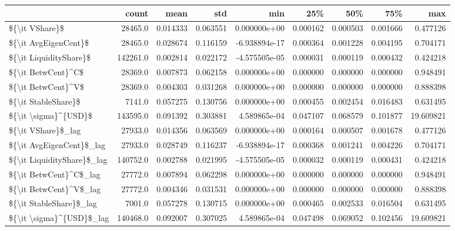 \begin{tabular}{lrrrrrrrr}
\toprule
{} &     count &      mean &       std &           min &       25\% &       50\% &       75\% &        max \\
\midrule
\$\{\textbackslash it VShare\}\$             &   28465.0 &  0.014333 &  0.063551 &  0.000000e+00 &  0.000162 &  0.000503 &  0.001666 &   0.477126 \\
\$\{\textbackslash it AvgEigenCent\}\$       &   28465.0 &  0.028674 &  0.116159 & -6.938894e-17 &  0.000364 &  0.001228 &  0.004195 &   0.704171 \\
\$\{\textbackslash it LiquidityShare\}\$     &  142261.0 &  0.002814 &  0.022172 & -4.575505e-05 &  0.000031 &  0.000119 &  0.000432 &   0.424218 \\
\$\{\textbackslash it BetwCent\}\textasciicircum C\$         &   28369.0 &  0.007873 &  0.062158 &  0.000000e+00 &  0.000000 &  0.000000 &  0.000000 &   0.948491 \\
\$\{\textbackslash it BetwCent\}\textasciicircum V\$         &   28369.0 &  0.004303 &  0.031268 &  0.000000e+00 &  0.000000 &  0.000000 &  0.000000 &   0.888398 \\
\$\{\textbackslash it StableShare\}\$        &    7141.0 &  0.057275 &  0.130756 &  0.000000e+00 &  0.000455 &  0.002454 &  0.016483 &   0.631495 \\
\$\{\textbackslash it \textbackslash sigma\}\textasciicircum \{USD\}\$       &  143595.0 &  0.091392 &  0.303881 &  4.589865e-04 &  0.047107 &  0.068579 &  0.101877 &  19.609821 \\
\$\{\textbackslash it VShare\}\$\_lag         &   27933.0 &  0.014356 &  0.063569 &  0.000000e+00 &  0.000164 &  0.000507 &  0.001678 &   0.477126 \\
\$\{\textbackslash it AvgEigenCent\}\$\_lag   &   27933.0 &  0.028749 &  0.116237 & -6.938894e-17 &  0.000368 &  0.001241 &  0.004226 &   0.704171 \\
\$\{\textbackslash it LiquidityShare\}\$\_lag &  140752.0 &  0.002788 &  0.021995 & -4.575505e-05 &  0.000032 &  0.000119 &  0.000431 &   0.424218 \\
\$\{\textbackslash it BetwCent\}\textasciicircum C\$\_lag     &   27772.0 &  0.007894 &  0.062298 &  0.000000e+00 &  0.000000 &  0.000000 &  0.000000 &   0.948491 \\
\$\{\textbackslash it BetwCent\}\textasciicircum V\$\_lag     &   27772.0 &  0.004346 &  0.031531 &  0.000000e+00 &  0.000000 &  0.000000 &  0.000000 &   0.888398 \\
\$\{\textbackslash it StableShare\}\$\_lag    &    7001.0 &  0.057278 &  0.130715 &  0.000000e+00 &  0.000465 &  0.002533 &  0.016504 &   0.631495 \\
\$\{\textbackslash it \textbackslash sigma\}\textasciicircum \{USD\}\$\_lag   &  140468.0 &  0.092007 &  0.307025 &  4.589865e-04 &  0.047498 &  0.069052 &  0.102456 &  19.609821 \\
\bottomrule
\end{tabular}
